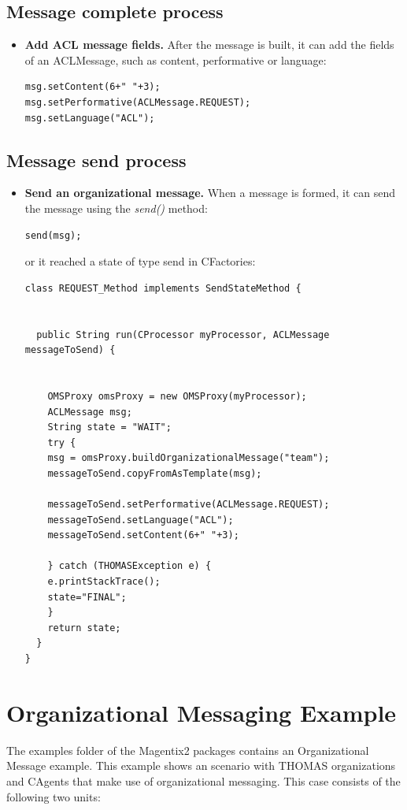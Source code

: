 \subsection{Message complete process}
\begin{itemize}
\item \textbf{Add ACL message fields.} After the message is built, it can add the fields of an ACLMessage, such as content, performative or language:
\begin{lstlisting}
msg.setContent(6+" "+3);
msg.setPerformative(ACLMessage.REQUEST);
msg.setLanguage("ACL");
\end{lstlisting}
\end{itemize}
\subsection{Message send process}
\begin{itemize}
\item \textbf{Send an organizational message.} When a message is formed, it can send the message using the \textit{send()} method:

\begin{lstlisting}
send(msg);
\end{lstlisting}
or it reached a state of type send in CFactories:
\begin{lstlisting}
class REQUEST_Method implements SendStateMethod {


  public String run(CProcessor myProcessor, ACLMessage messageToSend) {


    OMSProxy omsProxy = new OMSProxy(myProcessor);
    ACLMessage msg;
    String state = "WAIT";
    try {
	msg = omsProxy.buildOrganizationalMessage("team");
	messageToSend.copyFromAsTemplate(msg);

	messageToSend.setPerformative(ACLMessage.REQUEST);
	messageToSend.setLanguage("ACL");
	messageToSend.setContent(6+" "+3);

    } catch (THOMASException e) {
	e.printStackTrace();
	state="FINAL";
    }
    return state;
  }
}
\end{lstlisting}
\end{itemize}

\section{Organizational Messaging Example}

The examples folder of the Magentix2 packages contains an Organizational Message example. This example
shows an scenario with THOMAS organizations and CAgents that make use of organizational messaging. This
case consists of the following two units:

